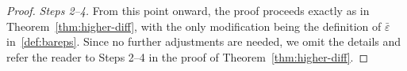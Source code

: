 \documentclass[10pt,a4paper]{amsart}
\renewcommand{\epsilon}{\varepsilon}
\begin{document}
\begin{proof}
\smallskip

\noindent
\textit{Steps 2--4.} 
From this point onward, the proof proceeds exactly as in Theorem~\ref{thm:higher-diff}, 
with the only modification being the definition of $\bar\epsilon$ in~\eqref{def:bareps}. 
Since no further adjustments are needed, we omit the details and refer the reader to Steps 2--4 in the proof of Theorem~\ref{thm:higher-diff}. 
\end{proof}
\end{document}
